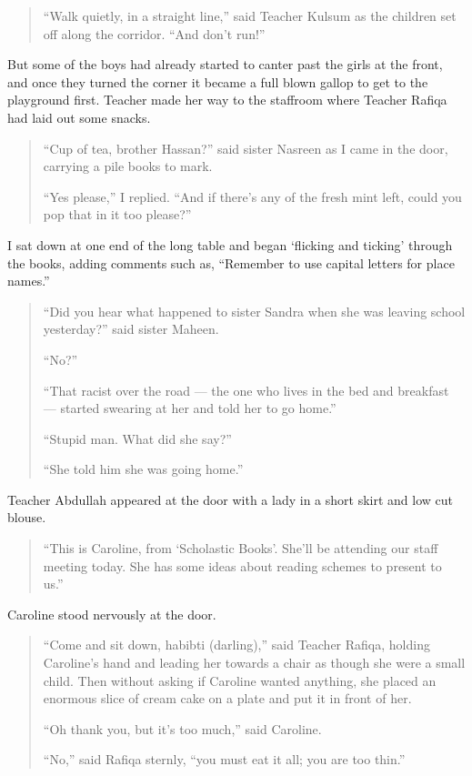 \documentclass[12pt]{memoir}
\begin{document}
\begin{quote}
“Walk quietly, in a straight line,”
said Teacher Kulsum as the children set off along the corridor.
“And don’t run!”
\end{quote}

But some of the boys had already started to canter past the girls at the front,
and once they turned the corner it became a full blown gallop
to get to the playground first.
Teacher  made her way to the staffroom
where Teacher Rafiqa had laid out some snacks.

\begin{quote}
“Cup of tea, brother Hassan?”
said sister Nasreen as I came in the door,
carrying a pile books to mark.

“Yes please,” I replied.
“And if there’s any of the fresh mint left,
could you pop that in it too please?”
\end{quote}

I sat down at one end of the long table
and began ‘flicking and ticking’ through the books, adding comments such as,
“Remember to use capital letters for place names.”

\begin{quote}
“Did you hear what happened to sister Sandra
when she was leaving school yesterday?” said sister Maheen.

“No?”

“That racist over the road — the one who lives in the bed and breakfast —
started swearing at her and told her to go home.”

“Stupid man.
What did she say?”

“She told him she was going home.”
\end{quote}

Teacher Abdullah appeared at the door with a lady
in a short skirt and low cut blouse.

\begin{quote}
“This is Caroline, from ‘Scholastic Books’.
She’ll be attending our staff meeting today.
She has some ideas about reading schemes to present to us.”
\end{quote}

Caroline stood nervously at the door.

\begin{quote}
“Come and sit down, habibti (darling),” said Teacher Rafiqa,
holding Caroline’s hand and leading her towards a chair
as though she were a small child.
Then without asking if Caroline wanted anything,
she placed an enormous slice of cream cake
on a plate and put it in front of her.

“Oh thank you, but it’s too much,” said Caroline.

“No,” said  Rafiqa sternly,
“you must eat it all; you are too thin.”
\end{quote}
\end{document}

